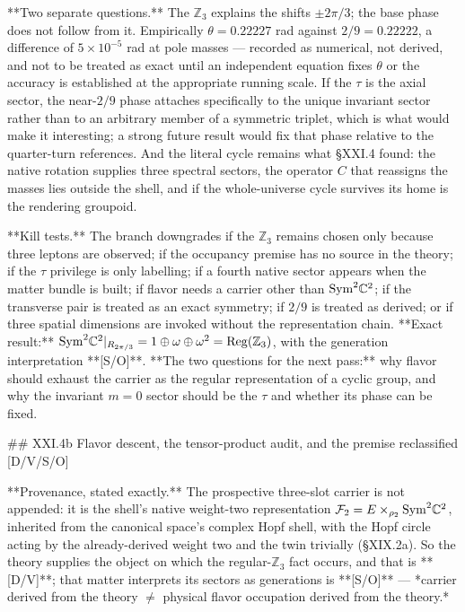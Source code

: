 **Two separate questions.** The $\mathbb Z_3$ explains the shifts $\pm2\pi/3$; the base phase does not follow from it. Empirically $\theta = 0.22227$ rad against $2/9 = 0.22222$, a difference of $5\times10^{-5}$ rad at pole masses — recorded as numerical, not derived, and not to be treated as exact until an independent equation fixes $\theta$ or the accuracy is established at the appropriate running scale. If the $\tau$ is the axial sector, the near-$2/9$ phase attaches specifically to the unique invariant sector rather than to an arbitrary member of a symmetric triplet, which is what would make it interesting; a strong future result would fix that phase relative to the quarter-turn references. And the literal cycle remains what §XXI.4 found: the native rotation supplies three spectral sectors, the operator $C$ that reassigns the masses lies outside the shell, and if the whole-universe cycle survives its home is the rendering groupoid.

**Kill tests.** The branch downgrades if the $\mathbb Z_3$ remains chosen only because three leptons are observed; if the occupancy premise has no source in the theory; if the $\tau$ privilege is only labelling; if a fourth native sector appears when the matter bundle is built; if flavor needs a carrier other than ${\rm Sym}^2\mathbb C^2$; if the transverse pair is treated as an exact symmetry; if $2/9$ is treated as derived; or if three spatial dimensions are invoked without the representation chain. **Exact result:** ${\rm Sym}^2\mathbb C^2|_{R_{2\pi/3} } = 1\oplus\omega\oplus\omega^2 = {\rm Reg}(\mathbb Z_3)$, with the generation interpretation **[S/O]**. **The two questions for the next pass:** why flavor should exhaust the carrier as the regular representation of a cyclic group, and why the invariant $m = 0$ sector should be the $\tau$ and whether its phase can be fixed.

## XXI.4b Flavor descent, the tensor-product audit, and the premise reclassified [D/V/S/O]

**Provenance, stated exactly.** The prospective three-slot carrier is not appended: it is the shell's native weight-two representation $\mathcal F_2 = E\times_{\rho_2}{\rm Sym}^2\mathbb C^2$, inherited from the canonical space's complex Hopf shell, with the Hopf circle acting by the already-derived weight two and the twin trivially (§XIX.2a). So the theory supplies the object on which the regular-$\mathbb Z_3$ fact occurs, and that is **[D/V]**; that matter interprets its sectors as generations is **[S/O]** — *carrier derived from the theory $\neq$ physical flavor occupation derived from the theory.*

